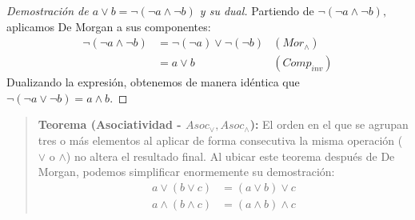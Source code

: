 {\begin{proof}[Demostración de $a \vee b = \neg (\neg a \wedge \neg b)$ y su dual]
Partiendo de $\neg (\neg a \wedge \neg b),$ aplicamos De Morgan a sus componentes:
\begin{align*}
    \neg (\neg a \wedge \neg b) &= \neg (\neg a) \vee \neg (\neg b) & (Mor_\wedge) \\
    &= a \vee b & (Comp_{inv})
\end{align*}
Dualizando la expresión, obtenemos de manera idéntica que $\neg (\neg a \vee \neg b) = a \wedge b.$
\end{proof}
}

\begin{quote}\textbf{Teorema (Asociatividad - $Asoc_\vee, Asoc_\wedge$):}\label{asociatividad}
El orden en el que se agrupan tres o más elementos al aplicar de forma consecutiva la misma operación ($\vee$ o $\wedge$) no altera el resultado final. Al ubicar este teorema después de De Morgan, podemos simplificar enormemente su demostración:
\begin{align*}
    a \vee (b \vee c) &= (a \vee b) \vee c \\
    a \wedge (b \wedge c) &= (a \wedge b) \wedge c
\end{align*}
\end{quote}
